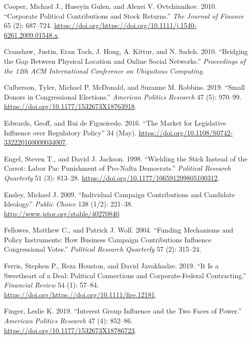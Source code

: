 \documentclass[12pt,]{article}
\begin{document}
\leavevmode\hypertarget{ref-cooper2010}{}%
Cooper, Michael J., Huseyin Gulen, and Alexei V. Ovtchinnikov. 2010.
``Corporate Political Contributions and Stock Returns.'' \emph{The
Journal of Finance} 65 (2): 687--724.
\url{https://doi.org/https://doi.org/10.1111/j.1540-6261.2009.01548.x}.

\leavevmode\hypertarget{ref-cranshaw2010}{}%
Cranshaw, Justin, Eran Toch, J. Hong, A. Kittur, and N. Sadeh. 2010.
``Bridging the Gap Between Physical Location and Online Social
Networks.'' \emph{Proceedings of the 12th ACM International Conference
on Ubiquitous Computing}.

\leavevmode\hypertarget{ref-culberson2019}{}%
Culberson, Tyler, Michael P. McDonald, and Suzanne M. Robbins. 2019.
``Small Donors in Congressional Elections.'' \emph{American Politics
Research} 47 (5): 970--99.
\url{https://doi.org/10.1177/1532673X18763918}.

\leavevmode\hypertarget{ref-edwards2016}{}%
Edwards, Geoff, and Rui de Figueiredo. 2016. ``The Market for
Legislative Influence over Regulatory Policy'' 34 (May).
\url{https://doi.org/10.1108/S0742-332220160000034007}.

\leavevmode\hypertarget{ref-engel1998}{}%
Engel, Steven T., and David J. Jackson. 1998. ``Wielding the Stick
Instead of the Carrot: Labor Pac Punishment of Pro-Nafta Democrats.''
\emph{Political Research Quarterly} 51 (3): 813--28.
\url{https://doi.org/10.1177/106591299805100312}.

\leavevmode\hypertarget{ref-ensley2009}{}%
Ensley, Michael J. 2009. ``Individual Campaign Contributions and
Candidate Ideology.'' \emph{Public Choice} 138 (1/2): 221--38.
\url{http://www.jstor.org/stable/40270840}.

\leavevmode\hypertarget{ref-fellowes2004}{}%
Fellowes, Matthew C., and Patrick J. Wolf. 2004. ``Funding Mechanisms
and Policy Instruments: How Business Campaign Contributions Influence
Congressional Votes.'' \emph{Political Research Quarterly} 57 (2):
315--24.

\leavevmode\hypertarget{ref-ferris2019}{}%
Ferris, Stephen P., Reza Houston, and David Javakhadze. 2019. ``It Is a
Sweetheart of a Deal: Political Connections and Corporate-Federal
Contracting.'' \emph{Financial Review} 54 (1): 57--84.
\url{https://doi.org/https://doi.org/10.1111/fire.12181}.

\leavevmode\hypertarget{ref-finger2019}{}%
Finger, Leslie K. 2019. ``Interest Group Influence and the Two Faces of
Power.'' \emph{American Politics Research} 47 (4): 852--86.
\url{https://doi.org/10.1177/1532673X18786723}.
\end{document}
